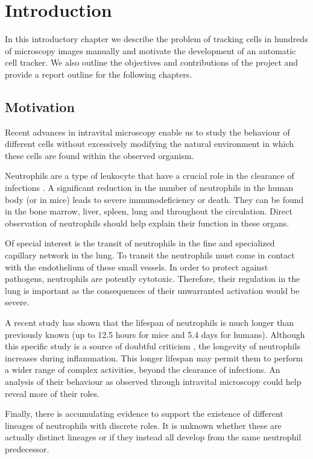 	\chapter{Introduction \statusfirstdraft}


	In this introductory chapter we describe the problem of tracking cells in hundreds of microscopy images manually and motivate the development of an automatic cell tracker. We also outline the objectives and contributions of the project and provide a report outline for the following chapters.
	
	\section{Motivation \statusfirstdraft}
		
		Recent advances in intravital microscopy enable us to study the behaviour of different cells without excessively modifying the natural environment in which these cells are found within the observed organism. 
			
		Neutrophils are a type of leukocyte that have a crucial role in the clearance of infections \cite{kolku13}. A significant reduction in the number of neutrophils in the human body (or in mice) leads to severe immunodeficiency or death. They can be found in the bone marrow, liver, spleen, lung and throughout the circulation. Direct observation of neutrophils should help explain their function in these organs. 
		
		Of special interest is the transit of neutrophils in the fine and specialized capillary network in the lung. To transit the neutrophils must come in contact with the endothelium of these small vessels. In order to protect against pathogens, neutrophils are potently cytotoxic. Therefore, their regulation in the lung is important as the consequences of their unwarranted activation would be severe.
		
		A recent study \cite{pillay10} has shown that the lifespan of neutrophils is much longer than previously known (up to 12.5 hours for mice and 5.4 days for humans). Although this specific study is a source of doubtful criticism \cite{toft11}, the longevity of neutrophils increases during inflammation. This longer lifespan may permit them to perform a wider range of complex activities, beyond the clearance of infections. An analysis of their behaviour as observed through intravital microscopy could help reveal more of their roles.
		
		Finally, there is accumulating evidence to support the existence of different lineages of neutrophils with discrete roles. It is unknown whether these are actually distinct lineages or if they instead all develop from the same neutrophil predecessor.
		
